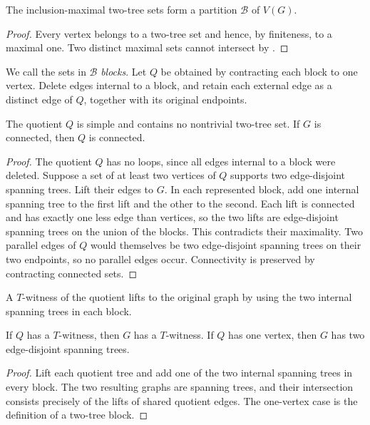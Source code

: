 \documentclass[USenglish, a4paper, thm-restate,numberwithinsect, cleveref]{lipics-v2021}
\begin{document}
\begin{corollary}\label{cor:characterization-partition}
The inclusion-maximal two-tree sets form a partition $\mathcal B$ of
$V(G)$.
\end{corollary}
\begin{proof}
Every vertex belongs to a two-tree set and hence, by finiteness, to a
maximal one. Two distinct maximal sets cannot intersect by
.
\end{proof}

We call the sets in $\mathcal B$ \emph{blocks}. Let $Q$ be obtained by
contracting each block to one vertex. Delete edges internal to a block, and retain each external edge
as a distinct edge of $Q$, together with its original endpoints.

\begin{lemma}\label{lem:characterization-quotient}
The quotient $Q$ is simple and contains no nontrivial two-tree set. If $G$ is connected, then $Q$ is connected.
\end{lemma}
\begin{proof}
The quotient $Q$ has no loops, since all edges internal to a block
were deleted. Suppose a set of at least two vertices of $Q$ supports
two edge-disjoint spanning trees. Lift their edges to $G$. In each
represented block, add one internal spanning tree to the first lift
and the other to the second. Each lift is connected and has exactly
one less edge than vertices, so the two lifts are edge-disjoint
spanning trees on the union of the blocks. This contradicts their
maximality. Two parallel edges of $Q$ would themselves be two
edge-disjoint spanning trees on their two endpoints, so no parallel
edges occur. Connectivity is preserved by contracting connected sets.
\end{proof}

A $T$-witness of the quotient lifts to the original graph by using
the two internal spanning trees in each block.

\begin{lemma}\label{lem:characterization-t-lift}
If $Q$ has a $T$-witness, then $G$ has a $T$-witness. If $Q$ has one
vertex, then $G$ has two edge-disjoint spanning trees.
\end{lemma}
\begin{proof}
Lift each quotient tree and add one of the two internal spanning trees
in every block. The two resulting graphs are spanning trees, and their
intersection consists precisely of the lifts of shared quotient edges.
The one-vertex case is the definition of a two-tree block.
\end{proof}
\end{document}

